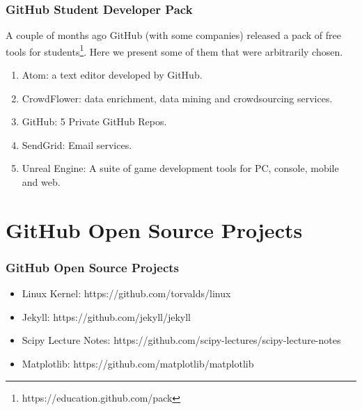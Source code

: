 \begin{frame}
    \frametitle{GitHub Student Developer Pack}
      
    A couple of months ago GitHub (with some companies) released a pack of free tools for students\footnote{https://education.github.com/pack}. Here we present some of them that were arbitrarily chosen.
    
    \begin{enumerate}    
    \item Atom: a text editor developed by GitHub. \pause
    
    \item CrowdFlower: data enrichment, data mining and crowdsourcing services. \pause
    
    \item GitHub: 5 Private GitHub Repos. \pause
    
    \item SendGrid: Email services. \pause
    
    \item Unreal Engine: A suite of game development tools for PC, console, mobile and web.
    \end{enumerate}

\end{frame}
    

\section[Open Source]{GitHub Open Source Projects}
\begin{frame}
    \frametitle{GitHub Open Source Projects}
    
    \begin{itemize}
    \item Linux Kernel: https://github.com/torvalds/linux \pause
    
    \item Jekyll: https://github.com/jekyll/jekyll \pause
        
    \item Scipy Lecture Notes: https://github.com/scipy-lectures/scipy-lecture-notes \pause
    
    \item Matplotlib: https://github.com/matplotlib/matplotlib
    \end{itemize}
\end{frame}


